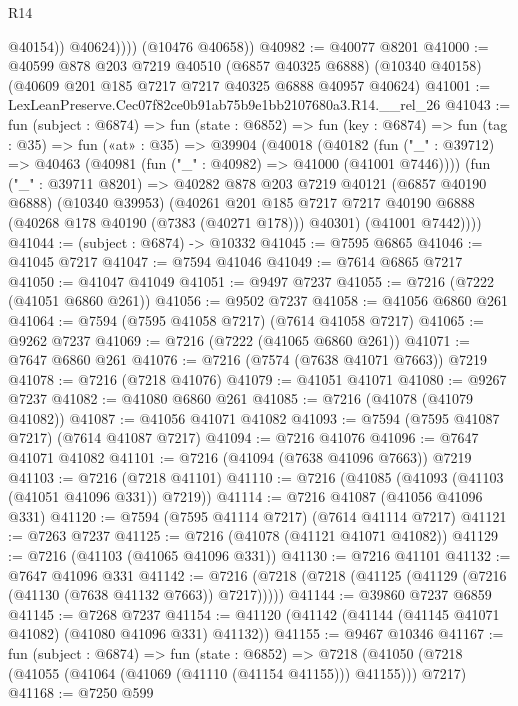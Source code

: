 \begin{lexlean}{R14}
\begin{coremodule}
                  @40154))
              @40624))))
      (@10476 @40658))
@40982 := @40077 @8201
@41000 := @40599
    @878
    @203
    @7219
    @40510
    (@6857 @40325 @6888)
    (@10340 @40158)
    (@40609 @201 @185 @7217 @7217 @40325 @6888 @40957 @40624)
@41001 := LexLeanPreserve.Cec07f82ce0b91ab75b9e1bb2107680a3.R14.__rel_26
@41043 := fun (subject : @6874) =>
  fun (state : @6852) =>
  fun (key : @6874) =>
  fun (tag : @35) =>
  fun («at» : @35) =>
  @39904
    (@40018
      (@40182
        (fun ("_" : @39712) => @40463 (@40981 (fun ("_" : @40982) => @41000 (@41001 @7446))))
        (fun ("_" : @39711 @8201) =>
        @40282
          @878
          @203
          @7219
          @40121
          (@6857 @40190 @6888)
          (@10340 @39953)
          (@40261
            @201
            @185
            @7217
            @7217
            @40190
            @6888
            (@40268 @178 @40190 (@7383 (@40271 @178)))
            @40301)
          (@41001 @7442))))
@41044 := (subject : @6874) -> @10332
@41045 := @7595 @6865
@41046 := @41045 @7217
@41047 := @7594 @41046
@41049 := @7614 @6865 @7217
@41050 := @41047 @41049
@41051 := @9497 @7237
@41055 := @7216 (@7222 (@41051 @6860 @261))
@41056 := @9502 @7237
@41058 := @41056 @6860 @261
@41064 := @7594 (@7595 @41058 @7217) (@7614 @41058 @7217)
@41065 := @9262 @7237
@41069 := @7216 (@7222 (@41065 @6860 @261))
@41071 := @7647 @6860 @261
@41076 := @7216 (@7574 (@7638 @41071 @7663)) @7219
@41078 := @7216 (@7218 @41076)
@41079 := @41051 @41071
@41080 := @9267 @7237
@41082 := @41080 @6860 @261
@41085 := @7216 (@41078 (@41079 @41082))
@41087 := @41056 @41071 @41082
@41093 := @7594 (@7595 @41087 @7217) (@7614 @41087 @7217)
@41094 := @7216 @41076
@41096 := @7647 @41071 @41082
@41101 := @7216 (@41094 (@7638 @41096 @7663)) @7219
@41103 := @7216 (@7218 @41101)
@41110 := @7216 (@41085 (@41093 (@41103 (@41051 @41096 @331)) @7219))
@41114 := @7216 @41087 (@41056 @41096 @331)
@41120 := @7594 (@7595 @41114 @7217) (@7614 @41114 @7217)
@41121 := @7263 @7237
@41125 := @7216 (@41078 (@41121 @41071 @41082))
@41129 := @7216 (@41103 (@41065 @41096 @331))
@41130 := @7216 @41101
@41132 := @7647 @41096 @331
@41142 := @7216 (@7218 (@7218 (@41125 (@41129 (@7216 (@41130 (@7638 @41132 @7663)) @7217)))))
@41144 := @39860 @7237 @6859
@41145 := @7268 @7237
@41154 := @41120 (@41142 (@41144 (@41145 @41071 @41082) (@41080 @41096 @331) @41132))
@41155 := @9467 @10346
@41167 := fun (subject : @6874) =>
  fun (state : @6852) =>
  @7218 (@41050 (@7218 (@41055 (@41064 (@41069 (@41110 (@41154 @41155))) @41155))) @7217)
@41168 := @7250 @599

\end{coremodule}
\end{lexlean}
